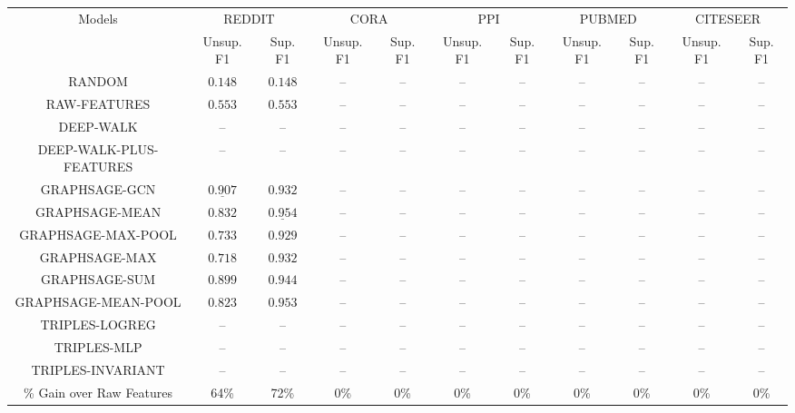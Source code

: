 \begin{tabular}{ccccccccccc}
    \hline
    \multirow{2}{*}{ Models } &
    	\multicolumn{2}{c}{ REDDIT } & 	\multicolumn{2}{c}{ CORA } & 	\multicolumn{2}{c}{ PPI } & 	\multicolumn{2}{c}{ PUBMED } & 	\multicolumn{2}{c}{ CITESEER } \\

    
    \cline { 2 - 11 } &
         Unsup. F1 & Sup. F1 &  Unsup. F1 & Sup. F1 &  Unsup. F1 & Sup. F1 &  Unsup. F1 & Sup. F1 &  Unsup. F1 & Sup. F1  \\
    
    \hline
    	RANDOM & $0.148$ & $0.148$ & -- & -- & -- & -- & -- & -- & -- & -- \\
	RAW-FEATURES & $0.553$ & $0.553$ & -- & -- & -- & -- & -- & -- & -- & -- \\
	DEEP-WALK & -- & -- & -- & -- & -- & -- & -- & -- & -- & -- \\
	DEEP-WALK-PLUS-FEATURES & -- & -- & -- & -- & -- & -- & -- & -- & -- & -- \\
	GRAPHSAGE-GCN & $\underline{\mathbf{0.907}}$ & $0.932$ & -- & -- & -- & -- & -- & -- & -- & -- \\
	GRAPHSAGE-MEAN & $0.832$ & $\underline{\mathbf{0.954}}$ & -- & -- & -- & -- & -- & -- & -- & -- \\
	GRAPHSAGE-MAX-POOL & $0.733$ & $0.929$ & -- & -- & -- & -- & -- & -- & -- & -- \\
	GRAPHSAGE-MAX & $0.718$ & $0.932$ & -- & -- & -- & -- & -- & -- & -- & -- \\
	GRAPHSAGE-SUM & $0.899$ & $0.944$ & -- & -- & -- & -- & -- & -- & -- & -- \\
	GRAPHSAGE-MEAN-POOL & $0.823$ & $0.953$ & -- & -- & -- & -- & -- & -- & -- & -- \\
	TRIPLES-LOGREG & -- & -- & -- & -- & -- & -- & -- & -- & -- & -- \\
	TRIPLES-MLP & -- & -- & -- & -- & -- & -- & -- & -- & -- & -- \\
	TRIPLES-INVARIANT & -- & -- & -- & -- & -- & -- & -- & -- & -- & -- \\

    
    \hline
    \% Gain over Raw Features & 64\% & 72\% & 0\% & 0\% & 0\% & 0\% & 0\% & 0\% & 0\% & 0\% \\
    \hline
    \end{tabular}